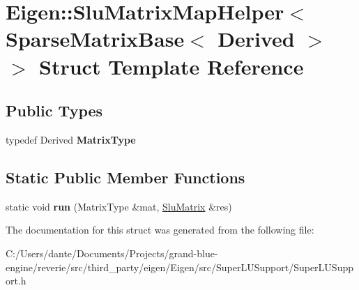 \hypertarget{struct_eigen_1_1_slu_matrix_map_helper_3_01_sparse_matrix_base_3_01_derived_01_4_01_4}{}\section{Eigen\+::Slu\+Matrix\+Map\+Helper$<$ Sparse\+Matrix\+Base$<$ Derived $>$ $>$ Struct Template Reference}
\label{struct_eigen_1_1_slu_matrix_map_helper_3_01_sparse_matrix_base_3_01_derived_01_4_01_4}
\subsection*{Public Types}
\begin{DoxyCompactItemize}
\item 
\mbox{\label{struct_eigen_1_1_slu_matrix_map_helper_3_01_sparse_matrix_base_3_01_derived_01_4_01_4_ab8e2343033878cdec662fc965bbd7e24}} 
typedef Derived {\bfseries Matrix\+Type}
\end{DoxyCompactItemize}
\subsection*{Static Public Member Functions}
\begin{DoxyCompactItemize}
\item 
\mbox{\label{struct_eigen_1_1_slu_matrix_map_helper_3_01_sparse_matrix_base_3_01_derived_01_4_01_4_ad1ab651e660a66310c7ba2ef7956ac99}} 
static void {\bfseries run} (Matrix\+Type \&mat, \mbox{\hyperlink{struct_eigen_1_1_slu_matrix}{Slu\+Matrix}} \&res)
\end{DoxyCompactItemize}


The documentation for this struct was generated from the following file\+:\begin{DoxyCompactItemize}
\item 
C\+:/\+Users/dante/\+Documents/\+Projects/grand-\/blue-\/engine/reverie/src/third\+\_\+party/eigen/\+Eigen/src/\+Super\+L\+U\+Support/Super\+L\+U\+Support.\+h\end{DoxyCompactItemize}
